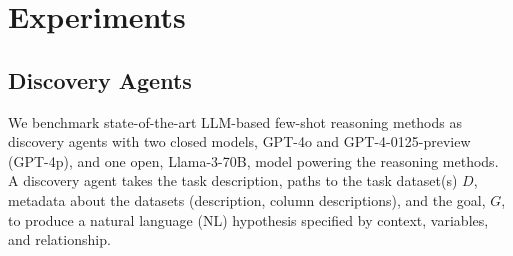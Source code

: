 \section{Experiments}
\label{sec:experiments}

\subsection{Discovery Agents}
\label{sec:discovery_agents}
We benchmark state-of-the-art LLM-based few-shot reasoning methods as discovery agents with two closed models, GPT-4o and GPT-4-0125-preview (GPT-4p), and one open, Llama-3-70B, model powering the reasoning methods. A discovery agent takes the task description, paths to the task dataset(s) $D$, metadata about the datasets (description, column descriptions), and the goal, $G$, to produce a natural language (NL) hypothesis specified by context, variables, and relationship. 



